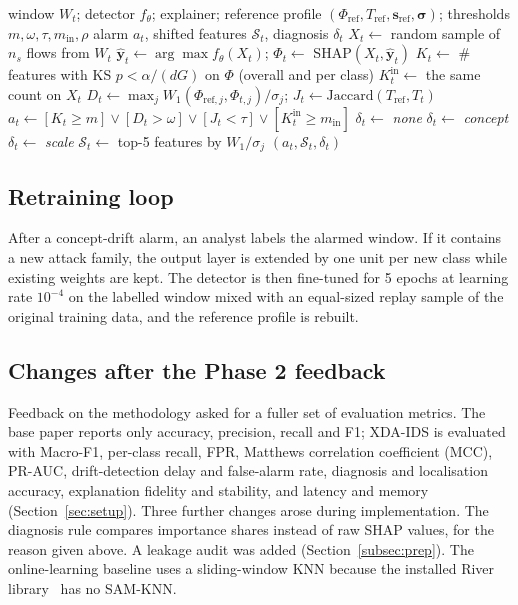 \documentclass[pdflatex,sn-mathphys-num]{sn-jnl}%
\begin{document}
\begin{algorithm}
\caption{SHAP-drift monitoring of one window}\label{alg:monitor}
\begin{algorithmic}[1]
\Require window $W_t$; detector $f_\theta$; explainer; reference profile $(\Phi_{\text{ref}},T_{\text{ref}},\mathbf{s}_{\text{ref}},\boldsymbol\sigma)$; thresholds $m,\omega,\tau,m_{\text{in}},\rho$
\Ensure alarm $a_t$, shifted features $\mathcal{S}_t$, diagnosis $\delta_t$
\State $X_t \gets$ random sample of $n_s$ flows from $W_t$
\State $\hat{\mathbf{y}}_t \gets \arg\max f_\theta(X_t)$; \quad $\Phi_t \gets$ SHAP$(X_t,\hat{\mathbf{y}}_t)$
\State $K_t \gets$ \# features with KS $p<\alpha/(dG)$ on $\Phi$ (overall and per class)
\State $K^{\text{in}}_t \gets$ the same count on $X_t$
\State $D_t \gets \max_j W_1(\Phi_{\text{ref},j},\Phi_{t,j})/\sigma_j$; \quad $J_t \gets \text{Jaccard}(T_{\text{ref}},T_t)$
\State $a_t \gets [K_t\ge m]\lor[D_t>\omega]\lor[J_t<\tau]\lor[K^{\text{in}}_t\ge m_{\text{in}}]$
 \State $\delta_t\gets$ \textit{none}
 \State $\delta_t\gets$ \textit{concept} 
\Else \State $\delta_t\gets$ \textit{scale} 
\EndIf
\State $\mathcal{S}_t\gets$ top-5 features by $W_1/\sigma_j$
\State \Return $(a_t,\mathcal{S}_t,\delta_t)$
\end{algorithmic}
\end{algorithm}

\subsection{Retraining loop}
After a concept-drift alarm, an analyst labels the alarmed window. If it contains a new attack family, the output layer is extended by one unit per new class while existing weights are kept. The detector is then fine-tuned for 5 epochs at learning rate $10^{-4}$ on the labelled window mixed with an equal-sized replay sample of the original training data, and the reference profile is rebuilt.

\subsection{Changes after the Phase 2 feedback}
Feedback on the methodology asked for a fuller set of evaluation metrics. The base paper reports only accuracy, precision, recall and F1; XDA-IDS is evaluated with Macro-F1, per-class recall, FPR, Matthews correlation coefficient (MCC), PR-AUC, drift-detection delay and false-alarm rate, diagnosis and localisation accuracy, explanation fidelity and stability, and latency and memory (Section~\ref{sec:setup}). Three further changes arose during implementation. The diagnosis rule compares importance shares instead of raw SHAP values, for the reason given above. A leakage audit was added (Section~\ref{subsec:prep}). The online-learning baseline uses a sliding-window KNN because the installed River library~\cite{montiel2021} has no SAM-KNN.
\end{document}
